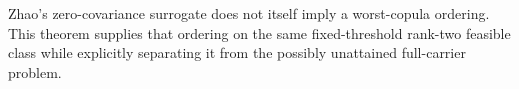 Zhao's zero-covariance surrogate does not itself imply a worst-copula ordering.  This theorem supplies that ordering on the same fixed-threshold rank-two feasible class while explicitly separating it from the possibly unattained full-carrier problem.